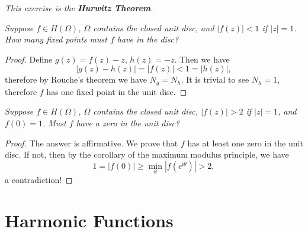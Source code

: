 \begin{note}\em
This exercise is the \textbf{Hurwitz Theorem}.
\end{note}
\begin{problem}\em
Suppose $f\in H(\Omega)$, $\Omega$ contains the closed unit disc, and $|f(z)|<1$ if $|z|=1$. How many fixed points must $f$ have in the disc?
\end{problem}
\begin{proof}
Define $g(z)=f(z)-z$, $h(z)=-z$. Then we have 
$$
\left| g\left( z \right) -h\left( z \right) \right|=\left| f\left( z \right) \right|<1=\left| h\left( z \right) \right|,
$$
therefore by Rouche's theorem we have $N_g=N_h$. It is trivial to see $N_h=1$, therefore $f$ has one fixed point in the unit disc.
\end{proof}
\begin{problem}\em
Suppose $f\in H(\Omega)$, $\Omega$ contains the closed unit disc, $|f(z)|>2$ if $|z|=1$, and $f(0)=1$. Must $f$ have a zero in the unit disc?
\end{problem}
\begin{proof}
The answer is affirmative. We prove that $f$ has at least one zero in the unit disc. If not, then by the corollary of the maximum modulus principle, we have 
$$
1=\left| f\left( 0 \right) \right|\ge \min_{\theta} \left| f\left( e^{\mathrm{i}\theta} \right) \right|>2,
$$
a contradiction!
\end{proof}
\newpage
\section{Harmonic Functions}
